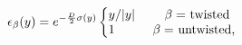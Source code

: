 \begin{equation}
\label{eq12}
\epsilon_\beta (y) = e^{-{D\over 2}\sigma(y)}
\left\{
    \begin{minipage}[c]{5cm}
        $y/|y|\qquad$   $\beta =$ twisted \\
        $1~~\qquad$       $\beta =$ untwisted,
    \end{minipage}
\right.
\end{equation}

